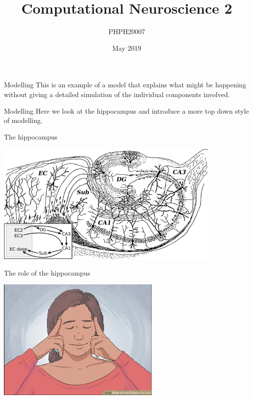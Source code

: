 \documentclass{beamer}
\title[Computational Neuroscience 2]{Computational Neuroscience 2}
\author{PHPH20007}
\institute{\texttt{github.com/conorhoughton/PHPH20007}}
\date{May 2019}
\begin{document}
\maketitle

\begin{frame}{Modelling}
This is an example of a model that explains what might be happening without giving a detailed simulation of the individual components involved.
  \end{frame}

\begin{frame}{Modelling}
  Here we look at the hippocampus and introduce a more top down style
  of modelling.
\end{frame}
  
\begin{frame}{The hippocampus}
  \begin{center}
    \includegraphics[height=6cm]{hippocampus.png}
  \end{center}
      \vfill
\end{frame}

\begin{frame}{The role of the hippocampus}
  \begin{center}
    \includegraphics[height=6cm]{finding_lost_items.png}
  \end{center}
      \vfill
\end{frame}
\end{document}
